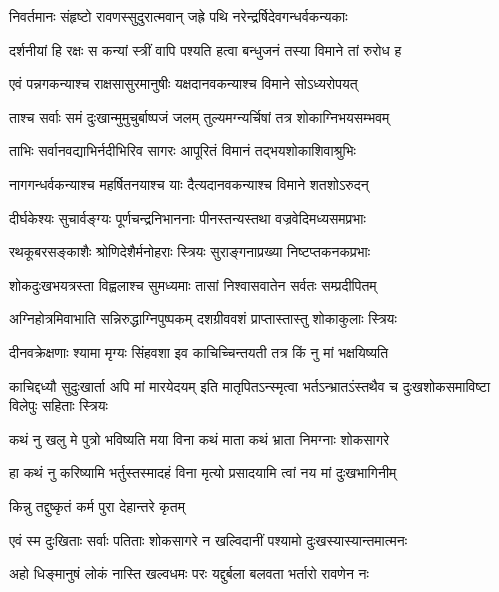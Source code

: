 
\twolineshloka
{निवर्तमानः संहृष्टो रावणस्सुदुरात्मवान्}
{जह्रे पथि नरेन्द्रर्षिदेवगन्धर्वकन्यकाः} %

\twolineshloka
{दर्शनीयां हि रक्षः स कन्यां स्त्रीं वापि पश्यति}
{हत्वा बन्धुजनं तस्या विमाने तां रुरोध ह} %

\twolineshloka
{एवं पन्नगकन्याश्च राक्षसासुरमानुषीः}
{यक्षदानवकन्याश्च विमाने सोऽध्यरोपयत्} %

\twolineshloka
{ताश्च सर्वाः समं दुःखान्मुमुचुर्बाष्पजं जलम्}
{तुल्यमग्न्यर्चिषां तत्र शोकाग्निभयसम्भवम्} %

\twolineshloka
{ताभिः सर्वानवद्याभिर्नदीभिरिव सागरः}
{आपूरितं विमानं तद्भयशोकाशिवाश्रुभिः} %

\twolineshloka
{नागगन्धर्वकन्याश्च महर्षितनयाश्च याः}
{दैत्यदानवकन्याश्च विमाने शतशोऽरुदन्} %

\twolineshloka
{दीर्घकेश्यः सुचार्वङ्ग्यः पूर्णचन्द्रनिभाननाः}
{पीनस्तन्यस्तथा वज्रवेदिमध्यसमप्रभाः} %

\twolineshloka
{रथकूबरसङ्काशैः श्रोणिदेशैर्मनोहराः}
{स्त्रियः सुराङ्गनाप्रख्या निष्टप्तकनकप्रभाः} %

\twolineshloka
{शोकदुःखभयत्रस्ता विह्वलाश्च सुमध्यमाः}
{तासां निश्वासवातेन सर्वतः सम्प्रदीपितम्} %

\twolineshloka
{अग्निहोत्रमिवाभाति सन्निरुद्धाग्निपुष्पकम्}
{दशग्रीववशं प्राप्तास्तास्तु शोकाकुलाः स्त्रियः} %

\twolineshloka
{दीनवक्रेक्षणाः श्यामा मृग्यः सिंहवशा इव}
{काचिच्चिन्तयती तत्र किं नु मां भक्षयिष्यति} %

\threelineshloka
{काचिद्दध्यौ सुदुःखार्ता अपि मां मारयेदयम्}
{इति मातृपितऽन्स्मृत्वा भर्तऽन्भ्रातऽंस्तथैव च}
{दुःखशोकसमाविष्टा विलेपुः सहिताः स्त्रियः} %

\twolineshloka
{कथं नु खलु मे पुत्रो भविष्यति मया विना}
{कथं माता कथं भ्राता निमग्नाः शोकसागरे} %

\twolineshloka
{हा कथं नु करिष्यामि भर्तुस्तस्मादहं विना}
{मृत्यो प्रसादयामि त्वां नय मां दुःखभागिनीम्} %

\onelineshloka
{किन्नु तद्दुष्कृतं कर्म पुरा देहान्तरे कृतम्} %

\twolineshloka
{एवं स्म दुःखिताः सर्वाः पतिताः शोकसागरे}
{न खल्विदानीं पश्यामो दुःखस्यास्यान्तमात्मनः} %

\twolineshloka
{अहो धिङ्मानुषं लोकं नास्ति खल्वधमः परः}
{यद्दुर्बला बलवता भर्तारो रावणेन नः} %

